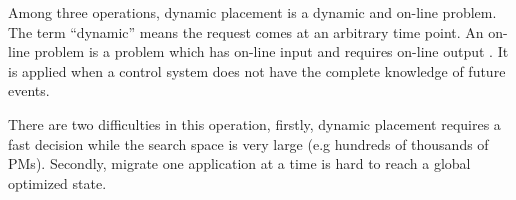 \begin{enumerate}
	Among three operations, dynamic placement is a dynamic and on-line problem.
	The term ``dynamic'' means the request comes at an arbitrary time point. An on-line problem is a problem which has on-line input and requires on-line output \cite{Borodin:uQcy_H6C}. It is applied when a control system does not have the complete knowledge of future events.

	There are two difficulties in this operation, firstly, dynamic placement requires a fast decision while the search space is very large (e.g hundreds of thousands of PMs). Secondly, migrate one application at a time is hard to reach a global optimized state.

\end{enumerate}



